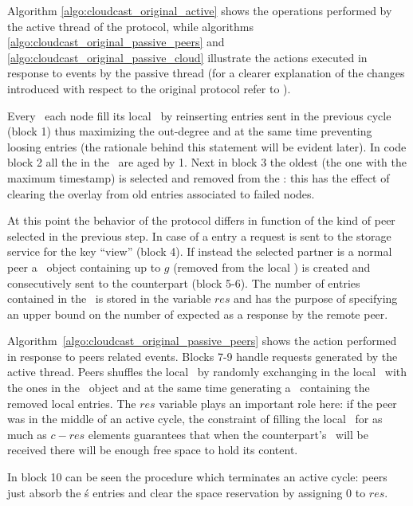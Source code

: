 Algorithm \ref{algo:cloudcast_original_active} shows the operations
performed by the active thread of the protocol, while algorithms
\ref{algo:cloudcast_original_passive_peers} and
\ref{algo:cloudcast_original_passive_cloud} illustrate the actions
executed in response to events by the passive thread (for a clearer
explanation of the changes introduced with respect to the original
\cyclon protocol refer to \cite{Cloudcast}).



Every \deltacyclon\ each node fill its local \view\ by reinserting
entries sent in the previous cycle (block 1) thus
maximizing the out-degree and at the same time preventing loosing
entries (the rationale behind this statement will be evident later).
In code block 2 all the \descriptor in the \view\ are aged
by 1. Next in block 3 the oldest \descriptor (the one with
the maximum timestamp) is selected and removed from the \view: this
has the effect of clearing the overlay from old entries associated to
failed nodes.

At this point the behavior of the protocol differs in function of the kind
of peer selected in the previous step. In case of a \cloud entry a
request is sent to the storage service for the key ``view''
(block 4). If instead the selected partner is a normal peer
a \request\ object containing up to $g$ \descriptors (removed from the
local \view) is created and consecutively sent to the counterpart
(block 5-6). The number of entries contained in
the \request\ is stored in the variable $res$ and has the purpose of
specifying an upper bound on the number of \descriptor expected as a
response by the remote peer.

Algorithm~\ref{algo:cloudcast_original_passive_peers} shows the action
performed in response to peers related
events. Blocks 7-9 handle requests generated by
the active thread. Peers shuffles the local \view\ by randomly exchanging
\descriptors in the local \view\ with the ones in the \request\ object
and at the same time generating a \reply\ containing the removed local
entries. The $res$ variable plays an important role here: if the peer
was in the middle of an active cycle, the constraint of filling the
local \view\ for as much as $c - res$ elements guarantees that when
the counterpart's \reply\ will be received there will be enough free
space to hold its content.

In block 10 can be seen the procedure which terminates an
active cycle: peers just absorb the \reply\'s entries and clear the
space reservation by assigning 0 to $res$.

